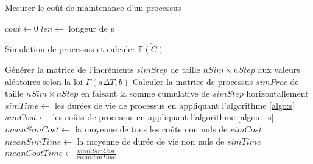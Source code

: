 \documentclass[10pt,a4paper]{article}
\begin{document}
\begin{algorithm}[!h]
    \caption{Mesurer le coût de maintenance d'un processus}
    \label{algo:c_s}
    $cout \leftarrow 0$\;
    $len \leftarrow $ longeur de $p$\;
\end{algorithm}

\begin{algorithm}[!h]
    \caption{Simulation de processus et calculer $\widehat{\mathbb{E}(C)}$}
    \label{algo:e_c}
    Générer la matrice de l'incréments $simStep$ de taille $nSim \times nStep$ aux valeurs aléatoires selon la loi $\Gamma(a\Delta T, b)$\;
    Calculer la matrice de processus $simProc$ de taille $nSim \times nStep$ en faisant la somme cumulative de $simStep$ horizontallement\;
    $simTime \leftarrow$ les durées de vie de processus en appliquant l'algorithme \eqref{algo:s}\;
    $simCost \leftarrow$ les coûts de processus en appliquant l'algorithme \eqref{algo:c_s}\;
    $meanSimCost \leftarrow$ la moyenne de tous les coûts non nuls de $simCost$\;
    $meanSimTime \leftarrow$ la moyenne de durée de vie non nuls de $simTime$\;
    $meanCostTime \leftarrow \frac{meanSimCost}{meanSimTime}$\;
\end{algorithm}
\end{document}
